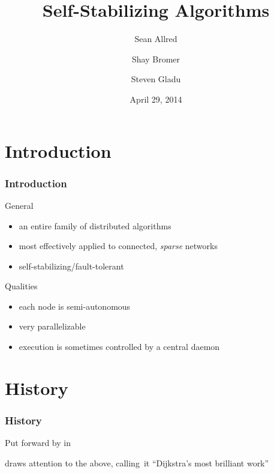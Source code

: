 \documentclass[
]{beamer}
\title{Self-Stabilizing Algorithms}
\author[%
Allred \and
Bromer \and
Gladu]
{Sean Allred \and
  Shay Bromer \and
  Steven Gladu}
\date{April 29, 2014}
\institute[SMCM]{St. Mary's College}
\begin{document}
\begin{frame}
  \maketitle
\end{frame}

\section{Introduction}
\begin{frame}
  \frametitle{Introduction}
  \begin{block}{General}
    \begin{itemize}[<+->]
    \item an entire family of distributed algorithms
    \item most effectively applied to connected, \emph{sparse} networks
    \item self-stabilizing\slash fault-tolerant
    \end{itemize}
  \end{block}
  \begin{block}{Qualities}
    \begin{itemize}[<+->]
    \item each node is semi-autonomous
    \item very parallelizable
    \item execution is sometimes controlled by a central daemon
    \end{itemize}
  \end{block}
\end{frame}

\section{History}
\begin{frame}
  \frametitle{History}
  \begin{description}[<+->]
  \item[\citeyear{dew:sem}] Put forward by \citeauthor{dew:sem} in
     \autocite{dew:sem}
  \item[\citeyear{lamport}] \citeauthor{lamport} draws attention to the above,
    calling~it \enquote{Dijkstra's most brilliant work}~\autocite{lamport}
  \end{description}
\end{frame}
\end{document}
